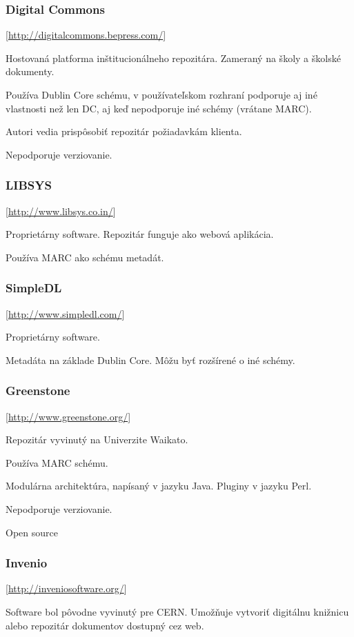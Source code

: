 \documentclass[thesis=M,slovak]{FITthesis}[2013/05/06]
\begin{document}
\subsubsection {Digital Commons}  [\url{http://digitalcommons.bepress.com/}]

Hostovaná platforma inštitucionálneho repozitára. Zameraný na školy a školské dokumenty.

Používa Dublin Core schému, v používateľskom rozhraní podporuje aj iné vlastnosti než len DC, aj keď nepodporuje iné schémy (vrátane MARC).

Autori vedia prispôsobiť repozitár požiadavkám klienta.

Nepodporuje verziovanie.

\subsubsection {LIBSYS}  [\url{http://www.libsys.co.in/}]

Proprietárny software. Repozitár funguje ako webová aplikácia.

Používa MARC ako schému metadát.

\subsubsection {SimpleDL}  [\url{http://www.simpledl.com/}]

Proprietárny software.

Metadáta na základe Dublin Core. Môžu byť rozšírené o iné schémy.

\subsubsection {Greenstone}  [\url{http://www.greenstone.org/}]

Repozitár vyvinutý na Univerzite Waikato.

Používa MARC schému.

Modulárna architektúra, napísaný v jazyku Java. Pluginy v jazyku Perl.

Nepodporuje verziovanie.

Open source

\subsubsection {Invenio}  [\url{http://inveniosoftware.org/}]

Software bol pôvodne vyvinutý pre CERN. Umožňuje vytvoriť digitálnu knižnicu alebo repozitár dokumentov dostupný cez web. 
\end{document}
